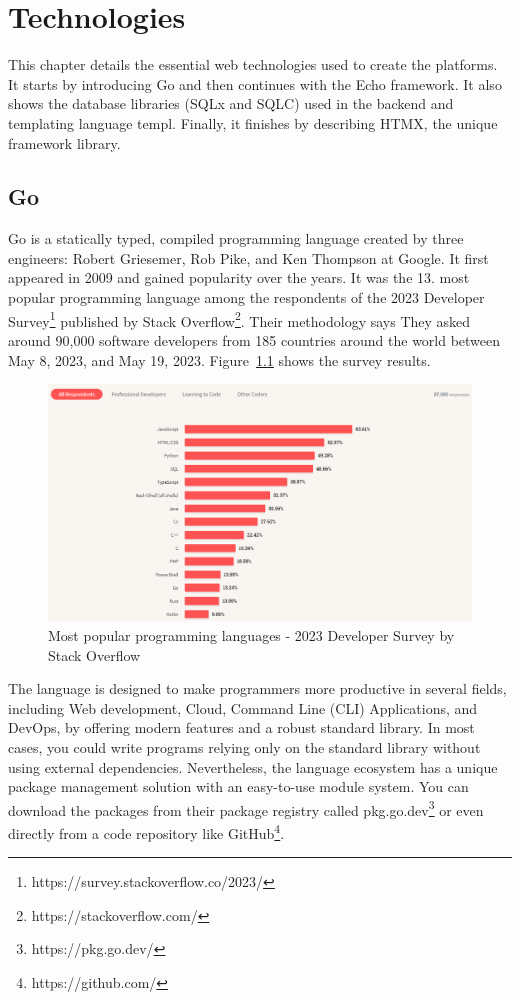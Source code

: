 \chapter{Technologies}\label{ch:technologies}

This chapter details the essential web technologies used to create the platforms. It starts by introducing Go and then continues with the Echo framework. It also shows the database libraries (SQLx and SQLC) used in the backend and templating language templ. Finally, it finishes by describing HTMX, the unique framework library.

\section{Go}
Go is a statically typed, compiled programming language created by three engineers: Robert Griesemer, Rob Pike, and Ken Thompson at Google. It first appeared in 2009 and gained popularity over the years. It was the 13. most popular programming language among the respondents of the 2023 Developer Survey\footnote{https://survey.stackoverflow.co/2023/} published by Stack Overflow\footnote{https://stackoverflow.com/}. Their methodology says They asked around 90,000 software developers from 185 countries around the world between May 8, 2023, and May 19, 2023. Figure~\ref{fig:go-stackoverflow} shows the survey results.

\begin{figure}
    \centering
    \includegraphics[width=160mm, keepaspectratio]{figures/go-stack-overflow.png}
    \caption{Most popular programming languages - 2023 Developer Survey by Stack Overflow}
    \label{fig:go-stackoverflow}
\end{figure}

The language is designed to make programmers more productive in several fields, including  Web development, Cloud, Command Line (CLI) Applications, and DevOps, by offering modern features and a robust standard library. In most cases, you could write programs relying only on the standard library without using external dependencies. Nevertheless, the language ecosystem has a unique package management solution with an easy-to-use module system. You can download the packages from their package registry called pkg.go.dev\footnote{https://pkg.go.dev/} or even directly from a code repository like GitHub\footnote{https://github.com/}.

